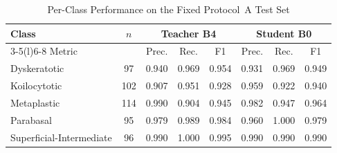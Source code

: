 \begin{table}[!htbp]
\caption{Per-Class Performance on the Fixed Protocol~A Test Set}
\label{tab:sperclass}
\centering\footnotesize
\begin{tabular}{@{}lccccccc@{}}
\toprule
Class & $n$ & \multicolumn{3}{c}{Teacher B4} & \multicolumn{3}{c}{Student B0} \\
\midrule
\cmidrule(lr){3-5}\cmidrule(l){6-8}
Metric & & Prec. & Rec. & F1 & Prec. & Rec. & F1 \\
Dyskeratotic & 97 & 0.940 & 0.969 & 0.954 & 0.931 & 0.969 & 0.949 \\
Koilocytotic & 102 & 0.907 & 0.951 & 0.928 & 0.959 & 0.922 & 0.940 \\
Metaplastic & 114 & 0.990 & 0.904 & 0.945 & 0.982 & 0.947 & 0.964 \\
Parabasal & 95 & 0.979 & 0.989 & 0.984 & 0.960 & 1.000 & 0.979 \\
Superficial-Intermediate & 96 & 0.990 & 1.000 & 0.995 & 0.990 & 0.990 & 0.990 \\
\bottomrule
\end{tabular}
\end{table}
